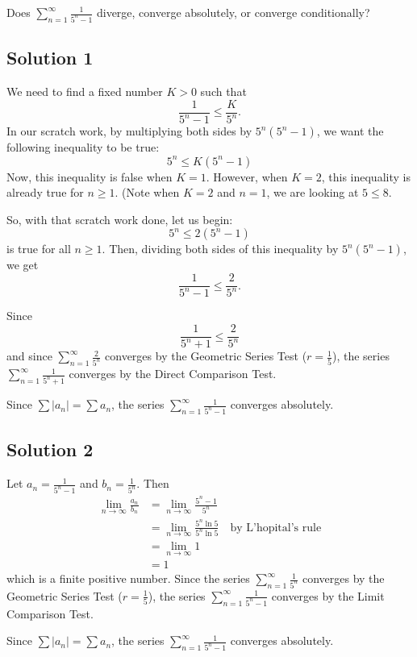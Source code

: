 \documentclass{article}
\begin{document}
\noindent
Does $\displaystyle \sum_{n=1}^\infty \frac{1}{5^n-1}$
diverge, converge absolutely, or converge conditionally?

\subsection*{Solution 1}

We need to find a fixed number $K > 0$ such that 
\[ \frac{1}{5^n-1} \leq \frac{K}{5^n}.\]
In our scratch work, by multiplying both sides by $5^n(5^n-1)$, we want the following inequality to be true:
\[ 5^n \leq K(5^n - 1) \]
Now, this inequality is false when $K=1$. However, when $K=2$, this inequality is already true for $n \geq 1$. (Note when $K=2$ and $n=1$, we are looking at $5 \leq 8$.

So, with that scratch work done, let us begin:
\[ 5^n \leq 2(5^n - 1) \]
is true for all $n \geq 1$. Then, dividing both sides of this inequality by $5^n(5^n-1)$, we get
\[ \frac{1}{5^n-1} \leq \frac{2}{5^n}.\]

Since 
\[ \frac{1}{5^n+1} \leq \frac{2}{5^n}\]
and since $\displaystyle \sum_{n=1}^\infty  \frac{2}{5^n}$ converges by the Geometric Series Test ($r=\frac15$), the series $\displaystyle \sum_{n=1}^\infty \frac{1}{5^n+1}$ converges by the Direct Comparison Test.

Since $\sum |a_n| = \sum a_n$, the series $\displaystyle \sum_{n=1}^\infty \frac{1}{5^n-1}$ converges absolutely.

\subsection*{Solution 2}

Let $a_n =  \frac{1}{5^n-1}$ and $b_n = \frac{1}{5^n}$. Then
\begin{align*}
\lim_{n \to \infty} \frac{a_n}{b_n}
&= \lim_{n \to \infty} \frac{5^n-1}{5^n} \\
&= \lim_{n \to \infty} \frac{5^n \ln 5}{5^n \ln 5}\quad\text{by L'hopital's rule} \\
& = \lim_{n \to \infty} 1\\
& = 1
\end{align*}
which is a finite positive number. Since the series  $\displaystyle \sum_{n=1}^\infty  \frac{1}{5^n}$ converges by the Geometric Series Test ($r=\frac15$), the series $\displaystyle \sum_{n=1}^\infty \frac{1}{5^n-1}$ converges by the Limit Comparison Test.

Since $\sum |a_n| = \sum a_n$, the series $\displaystyle \sum_{n=1}^\infty \frac{1}{5^n-1}$ converges absolutely.
\end{document}
